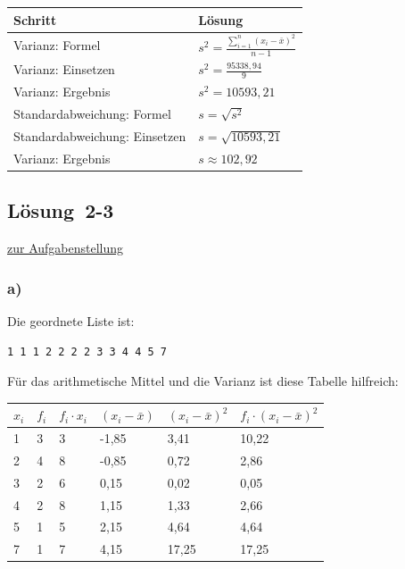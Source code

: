 \documentclass[
  11pt,
  ngerman,
  a4paper,
]{report}
\begin{document}
\begin{table}[H]
\centering
\begin{tabular}{ll}
\toprule
\textbf{Schritt} & \textbf{Lösung}\\
\midrule
Varianz: Formel & $s^2=\frac{\sum\limits_{i=1}^{n}(x_{i}-\bar{x})^2}{n-1}$\\
Varianz: Einsetzen & $s^2=\frac{95338{,}94}{9}$\\
Varianz: Ergebnis & $s^2=10593{,}21$\\
Standardabweichung: Formel & $s=\sqrt{s^2}$\\
Standardabweichung: Einsetzen & $s=\sqrt{10593{,}21}$\\
Varianz: Ergebnis & $s\approx102{,}92$\\
\bottomrule
\end{tabular}
\end{table}

\hypertarget{loesung-2-3}{%
\subsection{Lösung~2-3}\label{loesung-2-3}}

\protect\hyperlink{aufgabe-2-3}{zur Aufgabenstellung}

\hypertarget{a-4}{%
\subsubsection{a)}\label{a-4}}

Die geordnete Liste ist:

\begin{verbatim}
1 1 1 2 2 2 2 3 3 4 4 5 7
\end{verbatim}

Für das arithmetische Mittel und die Varianz ist diese Tabelle hilfreich:

\begin{table}[H]
\centering
\begin{tabular}{llllll}
\toprule
\textbf{$x_i$} & \textbf{$f_i$} & \textbf{$f_i\cdot x_i$} & \textbf{$(x_i-\bar{x})$} & \textbf{$(x_i-\bar{x})^2$} & \textbf{$f_i\cdot(x_i-\bar{x})^2$}\\
\midrule
1 & 3 & 3 & -1,85 & 3,41 & 10,22\\
2 & 4 & 8 & -0,85 & 0,72 & 2,86\\
3 & 2 & 6 & 0,15 & 0,02 & 0,05\\
4 & 2 & 8 & 1,15 & 1,33 & 2,66\\
5 & 1 & 5 & 2,15 & 4,64 & 4,64\\
7 & 1 & 7 & 4,15 & 17,25 & 17,25\\
\bottomrule
\end{tabular}
\end{table}
\end{document}
